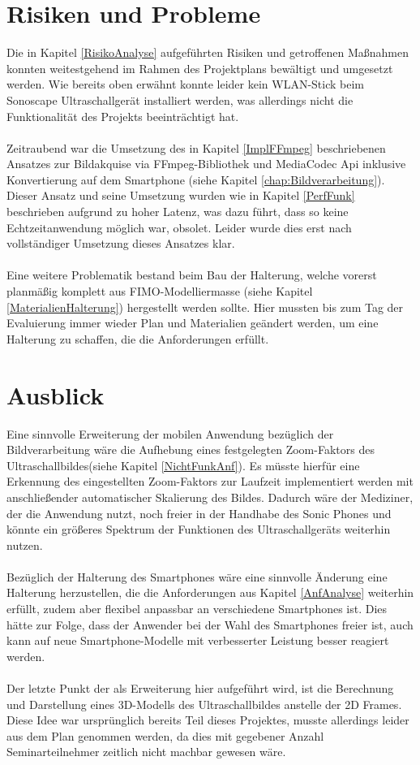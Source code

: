 \section{Risiken und Probleme}
Die in Kapitel \ref{RisikoAnalyse} aufgeführten Risiken und getroffenen Maßnahmen konnten weitestgehend im Rahmen des Projektplans bewältigt und umgesetzt werden. Wie bereits oben erwähnt konnte leider kein WLAN-Stick beim Sonoscape Ultraschallgerät installiert werden, was allerdings nicht die Funktionalität des Projekts beeinträchtigt hat.
\\
\\
Zeitraubend war die Umsetzung des in Kapitel \ref{ImplFFmpeg} beschriebenen Ansatzes zur Bildakquise via FFmpeg-Bibliothek und MediaCodec Api inklusive Konvertierung auf dem Smartphone (siehe Kapitel \ref{chap:Bildverarbeitung}). Dieser Ansatz und seine Umsetzung wurden wie in Kapitel \ref{PerfFunk} beschrieben aufgrund zu hoher Latenz, was dazu führt, dass so keine Echtzeitanwendung möglich war, obsolet. Leider wurde dies erst nach vollständiger Umsetzung dieses Ansatzes klar. 
\\
\\
Eine weitere Problematik bestand beim Bau der Halterung, welche vorerst planmäßig komplett aus FIMO-Modelliermasse (siehe Kapitel \ref{MaterialienHalterung}) hergestellt werden sollte. Hier mussten bis zum Tag der Evaluierung immer wieder Plan und Materialien geändert werden, um eine Halterung zu schaffen, die die Anforderungen erfüllt.

\section{Ausblick}
Eine sinnvolle Erweiterung der mobilen Anwendung bezüglich der Bildverarbeitung wäre die Aufhebung eines festgelegten Zoom-Faktors des Ultraschallbildes(siehe Kapitel \ref{NichtFunkAnf}). Es müsste hierfür eine Erkennung des eingestellten Zoom-Faktors zur Laufzeit implementiert werden mit anschließender automatischer Skalierung des Bildes. Dadurch wäre der Mediziner, der die Anwendung nutzt, noch freier in der Handhabe des Sonic Phones und könnte ein größeres Spektrum der Funktionen des Ultraschallgeräts weiterhin nutzen.
\\
\\
Bezüglich der Halterung des Smartphones wäre eine sinnvolle Änderung eine Halterung herzustellen, die die Anforderungen aus Kapitel \ref{AnfAnalyse} weiterhin erfüllt, zudem aber flexibel anpassbar an verschiedene Smartphones ist. Dies hätte zur Folge, dass der Anwender bei der Wahl des Smartphones freier ist, auch kann auf neue Smartphone-Modelle mit verbesserter Leistung besser reagiert werden.
\\
\\
Der letzte Punkt der als Erweiterung hier aufgeführt wird, ist die Berechnung und Darstellung eines 3D-Modells des Ultraschallbildes anstelle der 2D Frames. Diese Idee war ursprünglich bereits Teil dieses Projektes, musste allerdings leider aus dem Plan genommen werden, da dies mit gegebener Anzahl Seminarteilnehmer zeitlich nicht machbar gewesen wäre.

